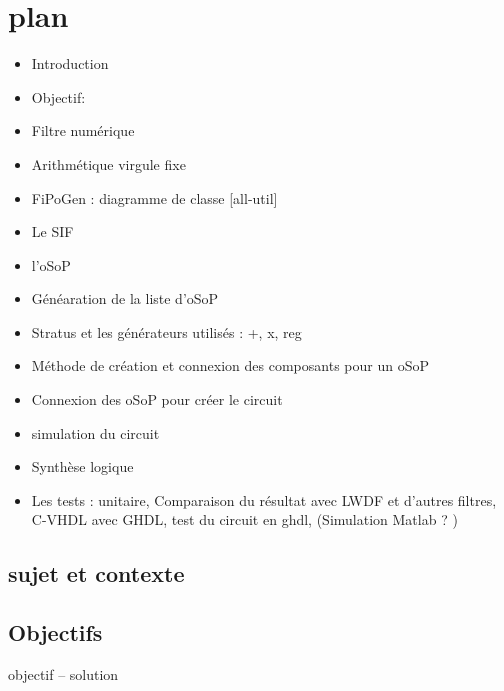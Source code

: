 \chapter{plan}
\begin{itemize}
\item Introduction
\item Objectif:
\item Filtre numérique
\item  Arithmétique virgule fixe
\item FiPoGen : diagramme de classe [all-util]
\item Le SIF
\item l'oSoP
\item Généaration de la liste d'oSoP
\item Stratus et les générateurs utilisés : +, x, reg
\item Méthode de création et connexion des composants pour un oSoP 
\item Connexion des oSoP pour créer le circuit
\item simulation du circuit
\item Synthèse logique
\item Les tests : unitaire, Comparaison du résultat avec LWDF et d'autres filtres, C-VHDL avec GHDL, test du circuit en ghdl, (Simulation Matlab ? )
\end{itemize}

\section{sujet et contexte}
\section{Objectifs}
objectif -- solution 